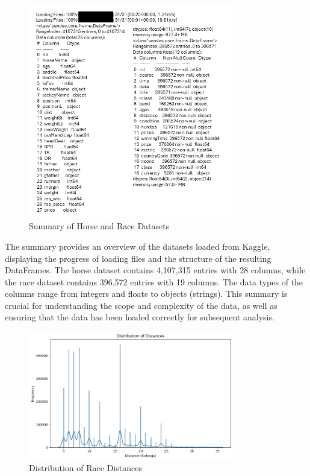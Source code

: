 \documentclass{article}
\begin{document}
\begin{figure}[H]
    \centering
    \includegraphics[width=0.8\textwidth]{images/data_summary.png} %
    \caption{Summary of Horse and Race Datasets}
    \label{fig:data_summary}
\end{figure}

The summary provides an overview of the datasets loaded from Kaggle, displaying the progress of loading files and the structure of the resulting DataFrames. The horse dataset contains 4,107,315 entries with 28 columns, while the race dataset contains 396,572 entries with 19 columns. The data types of the columns range from integers and floats to objects (strings). This summary is crucial for understanding the scope and complexity of the data, as well as ensuring that the data has been loaded correctly for subsequent analysis.

\begin{figure}[H]
    \centering
    \includegraphics[width=0.8\textwidth]{images/distribution_distances.png.png} %
    \caption{Distribution of Race Distances}
    \label{fig:distribution_distances}
\end{figure}
\end{document}
